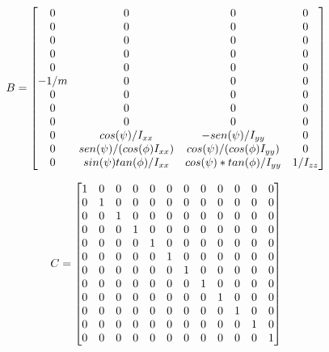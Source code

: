 \begin{equation*}
B =
\left[\begin{array}{@{}*{4}{c}@{}}
	0 & 0 & 0 & 0 \\
	0 & 0 & 0 & 0 \\
	0 & 0 & 0 & 0 \\
	0 & 0 & 0 & 0 \\
	0 & 0 & 0 & 0 \\
	-1/m & 0 & 0 & 0 \\
	0 & 0 & 0 & 0 \\
	0 & 0 & 0 & 0 \\
	0 & 0 & 0 & 0 \\
	0 & cos(\psi)/I_{xx} & -sen(\psi)/I_{yy} & 0 \\
	0 & sen(\psi)/(cos(\phi)I_{xx}) & cos(\psi)/(cos(\phi)I_{yy}) & 0\\
	0 & sin(\psi)tan(\phi)/I_{xx} & cos(\psi)*tan(\phi)/I_{yy} & 1/I_{zz} \\
\end{array}\right]
\end{equation*}

\begin{equation*}
C =
\left[ \begin{array}{@{}*{12}{c}@{}}
	1 & 0 & 0 & 0 & 0 & 0 & 0 & 0 & 0 & 0 & 0 & 0 \\
	0 & 1 & 0 & 0 & 0 & 0 & 0 & 0 & 0 & 0 & 0 & 0 \\
	0 & 0 & 1 & 0 & 0 & 0 & 0 & 0 & 0 & 0 & 0 & 0 \\
	0 & 0 & 0 & 1 & 0 & 0 & 0 & 0 & 0 & 0 & 0 & 0 \\
	0 & 0 & 0 & 0 & 1 & 0 & 0 & 0 & 0 & 0 & 0 & 0 \\
	0 & 0 & 0 & 0 & 0 & 1 & 0 & 0 & 0 & 0 & 0 & 0 \\
	0 & 0 & 0 & 0 & 0 & 0 & 1 & 0 & 0 & 0 & 0 & 0 \\
	0 & 0 & 0 & 0 & 0 & 0 & 0 & 1 & 0 & 0 & 0 & 0 \\
	0 & 0 & 0 & 0 & 0 & 0 & 0 & 0 & 1 & 0 & 0 & 0 \\
	0 & 0 & 0 & 0 & 0 & 0 & 0 & 0 & 0 & 1 & 0 & 0 \\
	0 & 0 & 0 & 0 & 0 & 0 & 0 & 0 & 0 & 0 & 1 & 0 \\
	0 & 0 & 0 & 0 & 0 & 0 & 0 & 0 & 0 & 0 & 0 & 1 \\
\end{array}\right]
\end{equation*}

